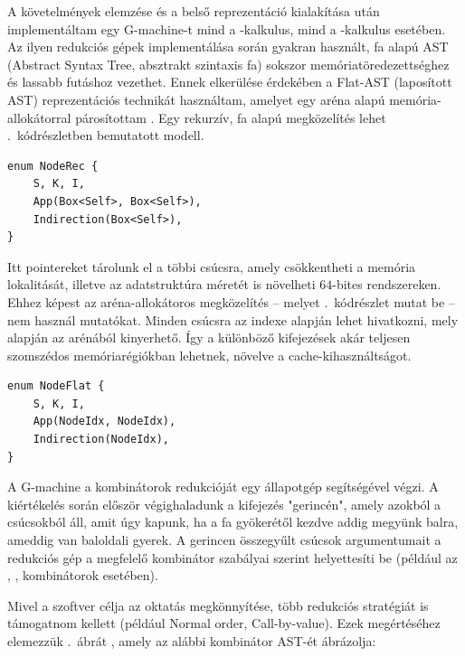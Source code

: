 \documentclass[a4paper,oneside]{article}
\begin{document}
A követelmények elemzése és a belső reprezentáció kialakítása után implementáltam egy \foreignlanguage{english}{G-machine}-t mind a \lam-kalkulus, mind a \ski-kalkulus esetében. Az ilyen redukciós gépek implementálása során gyakran használt, fa alapú AST (\foreignlanguage{english}{Abstract Syntax Tree}, absztrakt szintaxis fa) sokszor memóriatöredezettséghez és lassabb futáshoz vezethet. Ennek elkerülése érdekében a \foreignlanguage{english}{Flat-AST} (laposított AST) reprezentációs technikát használtam, amelyet egy aréna alapú memória-allokátorral párosítottam \cite{FlatteningASTsOther}. Egy rekurzív, fa alapú megközelítés lehet .~kódrészletben bemutatott modell.
\begin{lstlisting}[float=htbp, caption={Egy rekurzív, mutató alapú gráf struktúra}, label={lst:rec-node-ast}]
enum NodeRec {
    S, K, I,
    App(Box<Self>, Box<Self>),
    Indirection(Box<Self>),
}
\end{lstlisting}
Itt pointereket tárolunk el a többi csúcsra, amely csökkentheti a memória lokalitását, illetve az adatstruktúra méretét is növelheti $64$-bites rendszereken. Ehhez képest az aréna-allokátoros megközelítés -- melyet .~kódrészlet mutat be -- nem használ mutatókat. Minden csúcsra az indexe alapján lehet hivatkozni, mely alapján az arénából kinyerhető. Így a különböző kifejezések akár teljesen szomszédos memóriarégiókban lehetnek, növelve a cache-kihasználtságot.
\begin{lstlisting}[float=htbp, caption={Egy aréna-allokátoros gráf struktúra}, label={lst:arena-node-ast}]
enum NodeFlat {
    S, K, I,
    App(NodeIdx, NodeIdx),
    Indirection(NodeIdx),
}
\end{lstlisting}

A \foreignlanguage{english}{G-machine} a kombinátorok redukcióját egy állapotgép segítségével végzi. A kiértékelés során először végighaladunk a kifejezés "gerincén", amely azokból a csúcsokból áll, amit úgy kapunk, ha a fa gyökerétől kezdve addig megyünk balra, ameddig van baloldali gyerek. A gerincen összegyűlt csúcsok argumentumait a redukciós gép a megfelelő kombinátor szabályai szerint helyettesíti be (például az \Scomb, \Kcomb, \Icomb kombinátorok esetében).

Mivel a szoftver célja az oktatás megkönnyítése, több redukciós stratégiát is támogatnom kellett (például \foreignlanguage{english}{Normal order}, \foreignlanguage{english}{Call-by-value}). Ezek megértéséhez elemezzük .~ábrát \cite{wolframCombinatorsCentennialView2020}, amely az alábbi kombinátor AST-ét ábrázolja:
\end{document}
